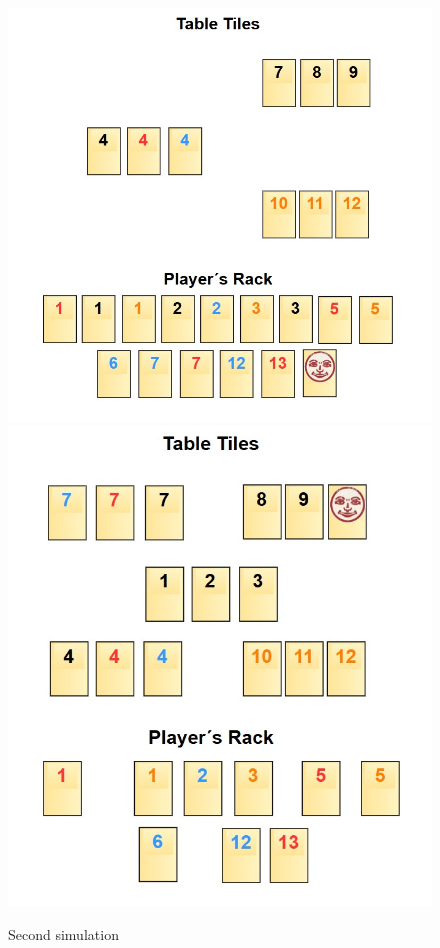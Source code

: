 \documentclass[11pt,letterpaper]{article}
\begin{document}
\newpage

\begin{figure}[H]
    \centering
    \includegraphics[width=.8\textwidth]{Figures/Initial_Board_2.png}
    \includegraphics[width=.8\textwidth]{Figures/Final_Board_2.png}
    \caption{Second simulation}
\end{figure}

\newpage
\end{document}
